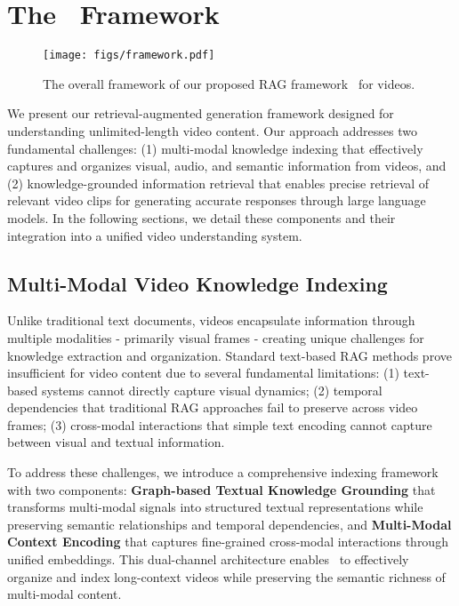 \section{The \model\ Framework}

\begin{figure*}[t]
    \centering
    \texttt{[image: figs/framework.pdf]}
    \vspace{-0.2in}
    \caption{The overall framework of our proposed RAG framework \model\ for videos.}
    \vspace{-0.1in}
    \label{fig:framework}
\end{figure*}

We present our retrieval-augmented generation framework designed for understanding unlimited-length video content. Our approach addresses two fundamental challenges: (1) multi-modal knowledge indexing that effectively captures and organizes visual, audio, and semantic information from videos, and (2) knowledge-grounded information retrieval that enables precise retrieval of relevant video clips for generating accurate responses through large language models. In the following sections, we detail these components and their integration into a unified video understanding system.

\subsection{Multi-Modal Video Knowledge Indexing}



Unlike traditional text documents, videos encapsulate information through multiple modalities - primarily visual frames - creating unique challenges for knowledge extraction and organization. Standard text-based RAG methods prove insufficient for video content due to several fundamental limitations: (1) text-based systems cannot directly capture visual dynamics; (2) temporal dependencies that traditional RAG approaches fail to preserve across video frames; (3) cross-modal interactions that simple text encoding cannot capture between visual and textual information. 

To address these challenges, we introduce a comprehensive indexing framework with two components: \textbf{Graph-based Textual Knowledge Grounding} that transforms multi-modal signals into structured textual representations while preserving semantic relationships and temporal dependencies, and \textbf{Multi-Modal Context Encoding} that captures fine-grained cross-modal interactions through unified embeddings. This dual-channel architecture enables \model\ to effectively organize and index long-context videos while preserving the semantic richness of multi-modal content.

